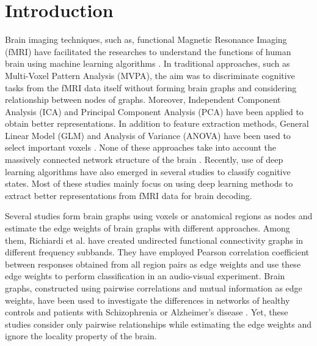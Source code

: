 \documentclass[runningheads]{llncs}
\begin{document}
\section{Introduction}

Brain imaging techniques, such as, functional Magnetic Resonance Imaging (fMRI) have facilitated the researches to understand the functions of human brain using machine learning algorithms \cite{pereira2009machine,mitchell2004learning,wang2004training,michel2012supervised}.
In traditional approaches, such as Multi-Voxel Pattern Analysis (MVPA), the aim was to discriminate cognitive tasks from the fMRI data itself without forming brain graphs and considering relationship between nodes of graphs. Moreover, Independent Component Analysis (ICA) and Principal Component Analysis (PCA) have been applied to obtain better representations. In addition to feature extraction methods, General Linear Model (GLM) and Analysis of Variance (ANOVA) have been used to select important voxels \cite{pereira2009machine}. None of these approaches take into account the massively connected network structure of the brain \cite{zhou2009detecting,smith2014group,calhoun2009review,calhoun2003ica,mckeown1998independent}. 
Recently, use of deep learning algorithms have also emerged in several studies \cite{kawahara2017brainnetcnn,koyamada2015deep,firat2014deep} to classify cognitive states. Most of these studies mainly focus on using deep learning methods to extract better representations from fMRI data for brain decoding.

Several studies form brain graphs using voxels or anatomical regions as nodes and estimate the edge weights of brain graphs with different approaches. Among them, Richiardi et al. \cite{richiardi2011decoding} have created undirected functional connectivity graphs in different frequency subbands. They have employed Pearson correlation coefficient between responses obtained from all region pairs as edge weights and use these edge weights to perform classification in an audio-visual experiment. Brain graphs, constructed using pairwise correlations and mutual information as edge weights, have been used to investigate the differences in networks of healthy controls and patients with Schizophrenia \cite{lynall2010functional} or Alzheimer's disease \cite{menon2011large,kurmukov2017classifying}. Yet, these studies consider only pairwise relationships while estimating the edge weights and ignore the locality property of the brain.
\end{document}
